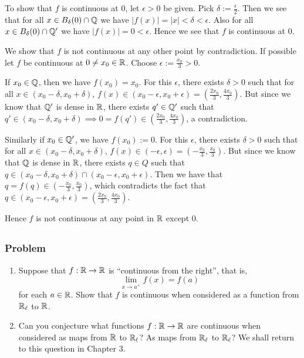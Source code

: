 To show that $f$ is continuous at 0, let $\epsilon > 0$ be given. Pick $\delta := \tfrac{\epsilon}{2}$. Then we see that for all $x \in B_\delta(0) \cap \mathbb Q$ we have $|f(x)| = |x| < \delta < \epsilon$. Also for all $x \in B_\delta(0) \cap \mathbb Q'$ we have $|f(x)| = 0 < \epsilon$. Hence we see that $f$ is continuous at 0.

We show that $f$ is not continuous at any other point by contradiction. If possible let $f$ be continuous at $0 \neq x_0 \in \mathbb R$. Choose $\epsilon := \tfrac{x_0}{3} > 0$.

If $x_0 \in \mathbb Q$, then we have $f(x_0) = x_0$. For this $\epsilon$, there exists $\delta > 0$ such that for all $x \in (x_0-\delta, x_0+\delta)$, $f(x) \in (x_0-\epsilon, x_0+\epsilon) = \left( \tfrac{2x_0}{3}, \tfrac{4x_0}{3} \right)$. But since we know that $\mathbb Q'$ is dense in $\mathbb R$, there exists $q' \in \mathbb Q'$ such that $q' \in (x_0-\delta, x_0+\delta) \implies 0 = f(q') \in \left( \tfrac{2x_0}{3}, \tfrac{4x_0}{3} \right)$, a contradiction.

Similarly if $x_0 \in \mathbb Q'$, we have $f(x_0) := 0$. For this $\epsilon$, there exists $\delta > 0$ such that for all $x \in (x_0-\delta, x_0+\delta)$, $f(x) \in (-\epsilon, \epsilon) = \left( -\tfrac{x_0}{3}, \tfrac{x_0}{3} \right)$. But since we know that $\mathbb Q$ is dense in $\mathbb R$, there exists $q \in Q$ such that $q \in (x_0-\delta, x_0+\delta) \cap (x_0-\epsilon, x_0+\epsilon)$. Then we have that $q = f(q) \in \left( -\tfrac{x_0}{3}, \tfrac{x_0}{3} \right)$, which contradicts the fact that $q \in (x_0-\epsilon, x_0+\epsilon) = \left( \tfrac{2x_0}{3}, \tfrac{4x_0}{3} \right)$.

Hence $f$ is not continuous at any point in $\mathbb R$ except $0$.


\subsection{}

\subsubsection{Problem}
\begin{enumerate}
    \item Suppose that $f : \mathbb R \to \mathbb R$ is ``continuous from the right'', that is,
    \[ \lim_{x \to a^+}f(x) = f(a) \]
    for each $a \in \mathbb R$. Show that $f$ is continuous when considered as a function from $\mathbb R_\ell$ to $\mathbb R$.
    \item Can you conjecture what functions $f : \mathbb R \to \mathbb R$ are continuous when considered as maps from $\mathbb R$ to $\mathbb R_\ell$? As maps from $\mathbb R_\ell$ to $\mathbb R_\ell$? We shall return to this question in Chapter 3.
\end{enumerate}

